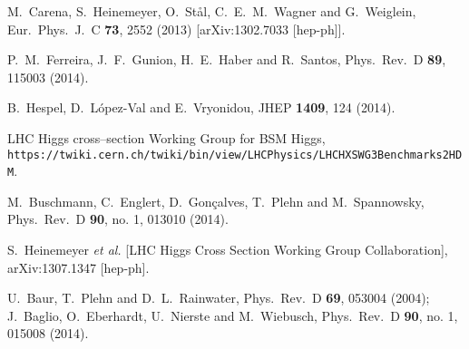   M.~Carena, S.~Heinemeyer, O.~St{\aa}l, C.~E.~M.~Wagner and G.~Weiglein,
  Eur.\ Phys.\ J.\ C {\bf 73}, 2552 (2013)
  [arXiv:1302.7033 [hep-ph]].

  P.~M.~Ferreira, J.~F.~Gunion, H.~E.~Haber and R.~Santos,
  Phys.\ Rev.\ D {\bf 89}, 115003 (2014).

  B.~Hespel, D.~L\'opez-Val and E.~Vryonidou,
  JHEP {\bf 1409}, 124 (2014).  
  
 LHC Higgs cross--section Working Group for BSM Higgs, \\
  \texttt{https://twiki.cern.ch/twiki/bin/view/LHCPhysics/LHCHXSWG3Benchmarks2HDM}.

  M.~Buschmann, C.~Englert, D.~Gon\c{c}alves, T.~Plehn and M.~Spannowsky,
  Phys.\ Rev.\ D {\bf 90}, no. 1, 013010 (2014).

  S.~Heinemeyer {\it et al.} [LHC Higgs Cross Section Working Group Collaboration],
  arXiv:1307.1347 [hep-ph].

  U.~Baur, T.~Plehn and D.~L.~Rainwater,
  Phys.\ Rev.\ D {\bf 69}, 053004 (2004);
  J.~Baglio, O.~Eberhardt, U.~Nierste and M.~Wiebusch,
  Phys.\ Rev.\ D {\bf 90}, no. 1, 015008 (2014).

